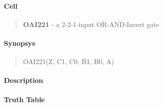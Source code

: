 \label{OAI221}
\paragraph{Cell}
\begin{quote}
    \textbf{OAI221} - a 2-2-1-input OR-AND-Invert gate
\end{quote}

\paragraph{Synopsys}
\begin{quote}
    OAI221(Z, C1, C0, B1, B0, A)
\end{quote}

\paragraph{Description}

%

\paragraph{Truth Table}


